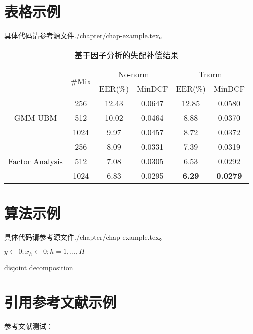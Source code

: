 \section{表格示例}
具体代码请参考源文件./chapter/chap-example.tex。
\begin{table}[htbp]
\centering
\caption{基于因子分析的失配补偿结果}
\label{tab:jfa-gmm-ubm}
\begin{tabular}{cccccc}
    \toprule
    &\multirow{2}{*}{\#Mix}&\multicolumn{2}{c}{No-norm}
    &\multicolumn{2}{c}{Tnorm}\\
    \cline{3-4} \cline{5-6}
		&		& EER(\%) 	& MinDCF & EER(\%) 	& MinDCF\\
    \midrule
	\multirow{3}{*}{GMM-UBM}
    &256 		& 12.43 	& 0.0647	& 12.85    & 0.0580\\
    &512 		& 10.02 	& 0.0464	& 8.88 	   & 0.0370\\
    &1024 		& 9.97 	    & 0.0457	& 8.72 	   & 0.0372\\
    \midrule
	\multirow{3}{*}{Factor Analysis}
    &256 		& 8.09 	& 0.0331 	& 7.39 	& 0.0319\\
    &512 		& 7.08 	& 0.0305 	& 6.53 	& 0.0292\\
    &1024 		& 6.83 	& 0.0295 	& \textbf{6.29} 	& \textbf{0.0279}\\
 \bottomrule
\end{tabular}
\end{table}

\section{算法示例}
具体代码请参考源文件./chapter/chap-example.tex。
\IncMargin{1em}
\begin{algorithm}
\BlankLine
\emph{$y\leftarrow 0;$$x_h\leftarrow 0;$$h=1,...,H$ }\;
\caption{disjoint decomposition}\label{algo_disjdecomp}
\end{algorithm}\DecMargin{1em}

\section{引用参考文献示例}
参考文献测试：\citep{deng:01a}
